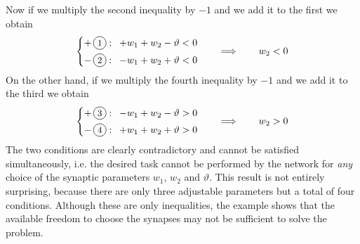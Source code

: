 \noindent
Now if we multiply the second inequality by $-1$ and we add it to the first we obtain
\begin{equation}
\begin{dcases}
+\mathinner{\circled{1}}:\hspace{5pt}+w_1+w_2-\vartheta<0\\
-\mathinner{\circled{2}}:\hspace{5pt}-w_1+w_2+\vartheta<0
\end{dcases}\qquad\Longrightarrow\qquad
w_2<0
\end{equation}
On the other hand, if we multiply the fourth inequality by $-1$ and we add it to the third we obtain
\begin{equation}
\begin{dcases}
+\mathinner{\circled{3}}:\hspace{5pt}-w_1+w_2-\vartheta>0\\
-\mathinner{\circled{4}}:\hspace{5pt}+w_1+w_2+\vartheta>0
\end{dcases}\qquad\Longrightarrow\qquad
w_2>0
\end{equation}
The two conditions are clearly contradictory and cannot be satisfied simultaneously, i.e. the desired task cannot be performed by the network for \emph{any} choice of the synaptic parameters $w_1$, $w_2$ and $\vartheta$. This result is not entirely surprising, because there are only three adjustable parameters but a total of four conditions. Although these are only inequalities, the example shows that the available freedom to choose the synapses may not be sufficient to solve the problem.

